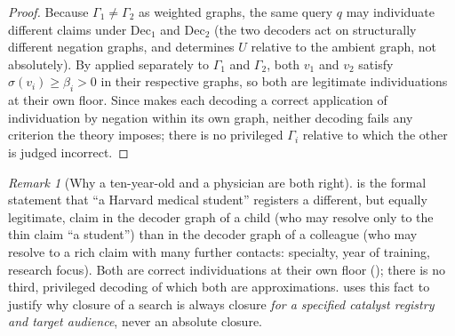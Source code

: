 \documentclass[11pt,twocolumn,a4paper]{article}
\theoremstyle{thmstyle}
\theoremstyle{definition}
\theoremstyle{remark}
\newtheorem{remark}[theorem]{Remark}
\newcommand{\Gph}{\Gamma}
\newcommand{\flo}{\beta}
\newcommand{\str}{\sigma}
\begin{document}
\begin{proof}
Because $\Gph_1\neq\Gph_2$ as weighted graphs, the same query $q$ may
individuate different claims under $\mathrm{Dec}_1$ and $\mathrm{Dec}_2$
(the two decoders act on structurally different negation graphs, and
 determines $U$ relative to the ambient graph, not
absolutely). By  applied separately to $\Gph_1$ and
$\Gph_2$, both $v_1$ and $v_2$ satisfy $\str(v_i)\ge\flo_i>0$ in their
respective graphs, so both are legitimate individuations at their own
floor. Since  makes each decoding a correct
application of individuation by negation within its own graph, neither
decoding fails any criterion the theory imposes; there is no privileged
$\Gph_i$ relative to which the other is judged incorrect.
\end{proof}

\begin{remark}[Why a ten-year-old and a physician are both right]
\label{rem:ten-year-old}
 is the formal statement that ``a Harvard
medical student'' registers a different, but equally legitimate, claim in
the decoder graph of a child (who may resolve only to the thin claim ``a
student'') than in the decoder graph of a colleague (who may resolve to a
rich claim with many further contacts: specialty, year of training,
research focus). Both are correct individuations at their own floor
(); there is no third, privileged decoding of which both
are approximations.  uses this fact to justify why
closure of a search is always closure \emph{for a specified catalyst
registry and target audience}, never an absolute closure.
\end{remark}
\end{document}
